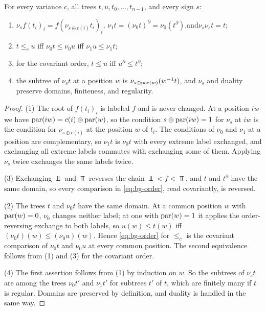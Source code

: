 \begin{lemma}\label{lem:bg-normalization}
For every variance $c$, all trees $t,u,t_0,\ldots,t_{n-1}$, and every sign $s$:
\begin{enumerate}[leftmargin=*]
\item $\nu_s f(t_i)_i=f(\nu_{s\oplus c(i)}t_i)_i$,\quad
  $\nu_1t=(\nu_0t)^{\partial}=\nu_0(t^{\partial})$,\quad and\quad $\nu_s\nu_st=t$;
\item $t\le_c u$ iff $\nu_0t\le\nu_0u$ iff $\nu_1u\le\nu_1t$;
\item for the covariant order, $t\le u$ iff $u^{\partial}\le t^{\partial}$;
\item the subtree of $\nu_st$ at a position $w$ is $\nu_{s\oplus\operatorname{par}(w)}(w^{-1}t)$,
  and $\nu_s$ and duality preserve domains, finiteness, and regularity.
\end{enumerate}
\end{lemma}
\begin{proof}
(1) The root of $f(t_i)_i$ is labeled $f$ and is never changed. At a position
$iw$ we have $\operatorname{par}(iw)=c(i)\oplus\operatorname{par}(w)$, so the condition $s\oplus\operatorname{par}(iw)=1$
for $\nu_s$ at $iw$ is the condition for $\nu_{s\oplus c(i)}$ at the position $w$
of $t_i$. The conditions of $\nu_0$ and $\nu_1$ at a position are
complementary, so $\nu_1t$ is $\nu_0t$ with every extreme label exchanged, and
exchanging all extreme labels commutes with exchanging some of them. Applying
$\nu_s$ twice exchanges the same labels twice.

(3) Exchanging $\Bot$ and $\Top$ reverses the chain $\Bot<f<\Top$, and $t$ and
$t^{\partial}$ have the same domain, so every comparison in \cref{eq:bg-order},
read covariantly, is reversed.

(2) The trees $t$ and $\nu_0t$ have the same domain. At a common position $w$
with $\operatorname{par}(w)=0$, $\nu_0$ changes neither label; at one with $\operatorname{par}(w)=1$ it
applies the order-reversing exchange to both labels, so $u(w)\le t(w)$ iff
$(\nu_0t)(w)\le(\nu_0u)(w)$. Hence \cref{eq:bg-order} for $\le_c$ is the
covariant comparison of $\nu_0t$ and $\nu_0u$ at every common position. The
second equivalence follows from (1) and (3) for the covariant order.

(4) The first assertion follows from (1) by induction on $w$. So the subtrees
of $\nu_st$ are among the trees $\nu_0t'$ and $\nu_1t'$ for subtrees $t'$ of
$t$, which are finitely many if $t$ is regular. Domains are preserved by
definition, and duality is handled in the same way.
\end{proof}

